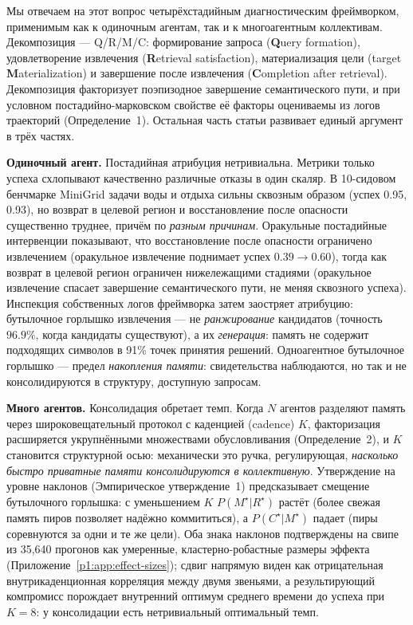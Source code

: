 \documentclass{article}
\begin{document}
Мы отвечаем на этот вопрос четырёхстадийным диагностическим фреймворком,
применимым как к одиночным агентам, так и к многоагентным коллективам.
Декомпозиция --- Q/R/M/C: формирование запроса (\textbf{Q}uery formation), удовлетворение
извлечения (\textbf{R}etrieval satisfaction), материализация цели (target \textbf{M}aterialization) и завершение
после извлечения (\textbf{C}ompletion after retrieval). Декомпозиция факторизует поэпизодное завершение семантического
пути, и при условном постадийно-марковском свойстве её факторы
оцениваемы из логов траекторий (Определение~1).
Остальная часть статьи развивает единый аргумент в трёх частях.

\textbf{Одиночный агент.} Постадийная атрибуция нетривиальна.
Метрики только успеха схлопывают качественно различные отказы в
один скаляр. В 10-сидовом бенчмарке MiniGrid задачи воды и отдыха
сильны сквозным образом (успех 0.95, 0.93), но возврат в целевой регион и
восстановление после опасности существенно труднее, причём по \emph{разным
причинам}. Оракульные постадийные интервенции показывают, что восстановление после опасности
ограничено извлечением (оракульное извлечение поднимает успех $0.39 \to 0.60$),
тогда как возврат в целевой регион ограничен нижележащими стадиями (оракульное извлечение
спасает завершение семантического пути, не меняя сквозного успеха).
Инспекция собственных логов фреймворка затем заостряет атрибуцию:
бутылочное горлышко извлечения --- не \emph{ранжирование} кандидатов (точность
$96.9\%$, когда кандидаты существуют), а их \emph{генерация}:
память не содержит подходящих символов в 91\% точек принятия решений.
Одноагентное бутылочное горлышко --- предел \emph{накопления памяти}:
свидетельства наблюдаются, но так и не консолидируются в структуру, доступную запросам.

\textbf{Много агентов.} Консолидация обретает темп.
Когда $N$ агентов разделяют память через широковещательный протокол с каденцией (cadence)
$K$, факторизация расширяется укрупнёнными множествами обусловливания
(Определение~2), и $K$ становится структурной осью: механически это
ручка, регулирующая, \emph{насколько быстро приватные памяти консолидируются
в коллективную}. Утверждение на уровне наклонов
(Эмпирическое утверждение~1) предсказывает смещение бутылочного горлышка: с уменьшением $K$
$P(M^\star|R^\star)$ растёт (более свежая память пиров позволяет
надёжно коммититься), а $P(C^\star|M^\star)$ падает (пиры соревнуются за
одни и те же цели). Оба знака наклонов подтверждены на свипе из 35{,}640 прогонов
как умеренные, кластерно-робастные размеры эффекта (Приложение~\ref{p1:app:effect-sizes}); сдвиг напрямую виден как отрицательная
внутрикаденционная корреляция между двумя звеньями, а результирующий
компромисс порождает внутренний оптимум среднего времени до успеха при
$K\!=\!8$: у консолидации есть нетривиальный оптимальный темп.
\end{document}
